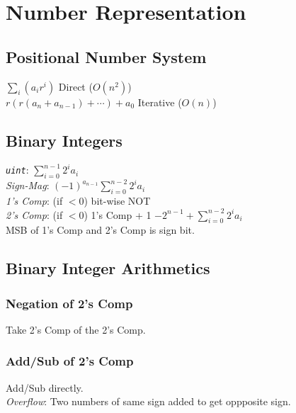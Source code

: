 \section{Number Representation}

\subsection*{Positional Number System}
$\sum_i (a_ir^i)$ \hfill Direct ($O(n^2)$)\\
$r(r(a_n + a_{n-1})+\cdots)+a_0$ \hfill Iterative ($O(n)$)\\

\subsection*{Binary Integers}
\emph{\texttt{uint}}: $\sum_{i=0}^{n-1} 2^i a_i$\\
\emph{Sign-Mag}: $(-1)^{a_{n-1}}\sum_{i=0}^{n-2} 2^i a_i$\\
\emph{1's Comp}: (if $<0$) bit-wise NOT\\
\emph{2's Comp}: (if $<0$) 1's Comp + 1 \quad $-2^{n-1} + \sum_{i=0}^{n-2} 2^i a_i$\\
MSB of 1's Comp and 2's Comp is sign bit.\\

\subsection*{Binary Integer Arithmetics}
\subsubsection*{Negation of 2's Comp}
Take 2's Comp of the 2's Comp.
\subsubsection*{Add/Sub of 2's Comp}
Add/Sub directly.\\
\emph{Overflow}: Two numbers of same sign added to get oppposite sign.
